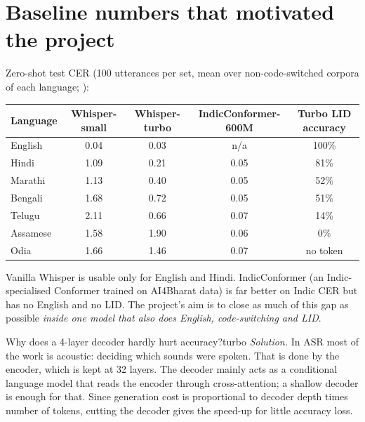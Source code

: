 \section{Baseline numbers that motivated the project}

Zero-shot test CER (100 utterances per set, mean over non-code-switched corpora of each language; ):

\begin{center}
\begin{tabular}{lcccc}
\toprule
Language & Whisper-small & Whisper-turbo & IndicConformer-600M & Turbo LID accuracy\\
\midrule
English & 0.04 & 0.03 & n/a & 100\%\\
Hindi & 1.09 & 0.21 & 0.05 & 81\%\\
Marathi & 1.13 & 0.40 & 0.05 & 52\%\\
Bengali & 1.68 & 0.72 & 0.05 & 51\%\\
Telugu & 2.11 & 0.66 & 0.07 & 14\%\\
Assamese & 1.58 & 1.90 & 0.06 & 0\%\\
Odia & 1.66 & 1.46 & 0.07 & no token\\
\bottomrule
\end{tabular}
\end{center}

Vanilla Whisper is usable only for English and Hindi. IndicConformer (an Indic-specialised Conformer trained on AI4Bharat data) is far
better on Indic CER but has no English and no LID. The project's aim is to close as much of this gap as possible \emph{inside one
model that also does English, code-switching and LID}.

\begin{exercise}{Why does a 4-layer decoder hardly hurt accuracy?}{turbo}
\textit{Solution.} In ASR most of the work is acoustic: deciding which sounds were spoken. That is done by the encoder, which is
kept at 32 layers. The decoder mainly acts as a conditional language model that reads the encoder through cross-attention; a shallow
decoder is enough for that. Since generation cost is proportional to decoder depth times number of tokens, cutting the decoder
gives the speed-up for little accuracy loss.
\end{exercise}
